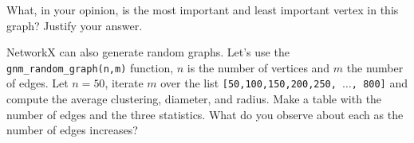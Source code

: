 \documentclass[11pt,letterpaper]{article}
\begin{document}
\begin{problem}
 \label{prob:end}
 What, in your opinion, is the most important and least important vertex in this graph? Justify your answer.
\end{problem} 


\begin{problem}
 NetworkX can also generate random graphs. Let's use the \texttt{gnm\_random\_graph(n,m)} function, $n$ is the number of vertices and $m$ the number of edges. Let $n= 50$, iterate $m$ over the list \texttt{[50,100,150,200,250, $\dots$, 800]} and compute the average clustering, diameter, and radius. Make a table with the number of edges and the three statistics. What do you observe about each as the number of edges increases?
\end{problem}
\end{document}
